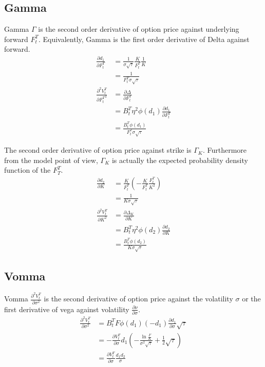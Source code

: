 \documentclass{article}
\begin{document}
\subsection{Gamma}

Gamma $ \Gamma $ is the second order derivative of option price against underlying forward $ F_t^T $.
Equivalently, Gamma is the first order derivative of Delta against forward. 
\begin{align} \label{Gamma_F derivation}
    \frac{\partial d_1}{\partial F_t^T} &= \frac{1}{\sigma \sqrt{\tau}} \frac{K}{F_t^T} \frac{1}{K} \nonumber \\
    &= \frac{1}{F_t^T \sigma \sqrt{\tau}} \nonumber \\
    \frac{\partial^2 V_t^T}{{\partial F_t^T}^2} &= \frac{\partial \Delta}{\partial F_t^T} \nonumber \\
    &= B_t^T \eta^2 \phi(d_1) \frac{\partial d_1}{\partial F_t^T} \nonumber \\
    &= \frac{B_t^T \phi(d_1)}{F_t^T \sigma \sqrt{\tau}}
\end{align}

The second order derivative of option price against strike is $ \Gamma_K $.
Furthermore from the model point of view, $ \Gamma_K $ is actually the expected probability density function of the $ F_T^T $.
\begin{align} \label{Gamma_K derivation}
    \frac{\partial d_2}{\partial K} &= \frac{K}{F_t^T} \left(-\frac{K}{F_t^T} \frac{F_t^T}{K^2} \right) \nonumber \\
    &= \frac{1}{K \sigma \sqrt{\tau}} \nonumber \\
    \frac{\partial^2 V_t^T}{{\partial K}^2} &= \frac{\partial \Delta_K}{\partial K} \nonumber \\
    &= B_t^T \eta^2 \phi(d_2) \frac{\partial d_2}{\partial K} \nonumber \\
    &= \frac{B_t^T \phi(d_2)}{K \sigma \sqrt{\tau}}
\end{align}

\subsection{Vomma}

Vomma $ \frac{\partial^2 V_t^T}{\partial \sigma^2} $ is the second derivative of option price against the volatility $ \sigma $ or the first derivative of vega against volatility $ \frac{\partial \nu}{\partial \sigma} $.
\begin{align}
    \frac{\partial^2 V_t^T}{\partial \sigma^2} &= B_t^T F \phi(d_1) (-d_1) \frac{\partial d_1}{\partial \sigma} \sqrt{\tau} \nonumber \\
    &= -\frac{\partial V_t^T}{\partial \sigma} d_1 \left(-\frac{\ln{\frac{F}{K}}}{\sigma^2 \sqrt{\tau}} + \frac{1}{2} \sqrt{\tau}\right) \nonumber \\
    &= \frac{\partial V_t^T}{\partial \sigma} \frac{d_1 d_2}{\sigma}
\end{align}
\end{document}
